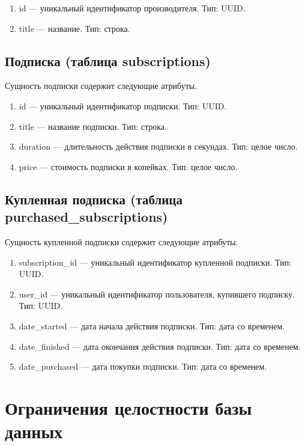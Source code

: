 \begin{enumerate}
	\item id --- уникальный идентификатор производителя. Тип: UUID.
	\item title --- название. Тип: строка.
\end{enumerate}

\subsection*{Подписка (таблица subscriptions)}

Сущность подписки содержит следующие атрибуты.

\begin{enumerate}
	\item id --- уникальный идентификатор подписки. Тип: UUID.
	\item title --- название подписки. Тип: строка.
	\item duration --- длительность действия подписки в секундах. Тип: целое число.
	\item price --- стоимость подписки в копейках. Тип: целое число.
\end{enumerate}

\subsection*{Купленная подписка (таблица purchased\_subscriptions)}

Сущность купленной подписки содержит следующие атрибуты.

\begin{enumerate}
	\item subscription\_id --- уникальный идентификатор купленной подписки. Тип: UUID.
	\item user\_id --- уникальный идентификатор пользователя, купившего подписку. Тип:
	      UUID.
	\item date\_started --- дата начала действия подписки. Тип: дата со временем.
	\item date\_finished --- дата окончания действия подписки. Тип: дата со временем.
	\item date\_purchased --- дата покупки подписки. Тип: дата со временем.
\end{enumerate}

\section{Ограничения целостности базы данных}

